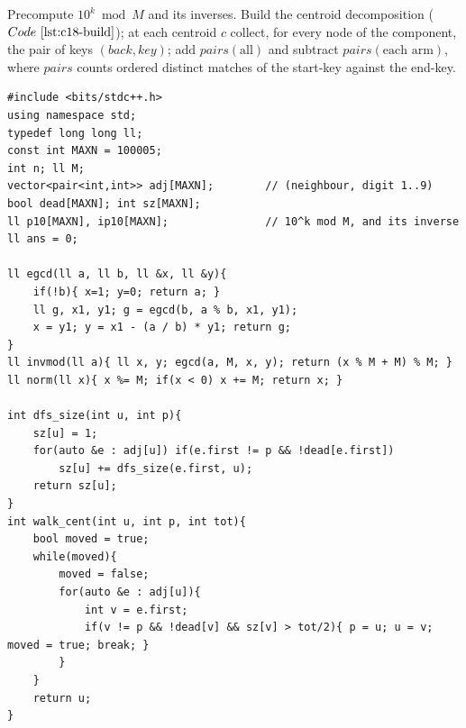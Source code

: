 Precompute \(10^k\bmod M\) and its inverses. Build the centroid decomposition
(\(\coderef{c18-build}\)); at each centroid \(c\) collect, for every node of the
component, the pair of keys \((\mathit{back},\mathit{key})\); add
\(\mathit{pairs}(\text{all})\) and subtract \(\mathit{pairs}(\text{each arm})\),
where \(\mathit{pairs}\) counts ordered distinct matches of the start-key against
the end-key.

\begin{lstlisting}[caption={CF 715C: centroid decomposition with a forward/backward decimal hash per node and a per-arm subtraction over hash maps; gcd(M,10)=1 supplies inv(10, M). M=1 is short-circuited. ASCII only}, label={lst:c18-715c}]
#include <bits/stdc++.h>
using namespace std;
typedef long long ll;
const int MAXN = 100005;
int n; ll M;
vector<pair<int,int>> adj[MAXN];        // (neighbour, digit 1..9)
bool dead[MAXN]; int sz[MAXN];
ll p10[MAXN], ip10[MAXN];               // 10^k mod M, and its inverse
ll ans = 0;

ll egcd(ll a, ll b, ll &x, ll &y){
    if(!b){ x=1; y=0; return a; }
    ll g, x1, y1; g = egcd(b, a % b, x1, y1);
    x = y1; y = x1 - (a / b) * y1; return g;
}
ll invmod(ll a){ ll x, y; egcd(a, M, x, y); return (x % M + M) % M; }
ll norm(ll x){ x %= M; if(x < 0) x += M; return x; }

int dfs_size(int u, int p){
    sz[u] = 1;
    for(auto &e : adj[u]) if(e.first != p && !dead[e.first])
        sz[u] += dfs_size(e.first, u);
    return sz[u];
}
int walk_cent(int u, int p, int tot){
    bool moved = true;
    while(moved){
        moved = false;
        for(auto &e : adj[u]){
            int v = e.first;
            if(v != p && !dead[v] && sz[v] > tot/2){ p = u; u = v; moved = true; break; }
        }
    }
    return u;
}


\end{lstlisting}
